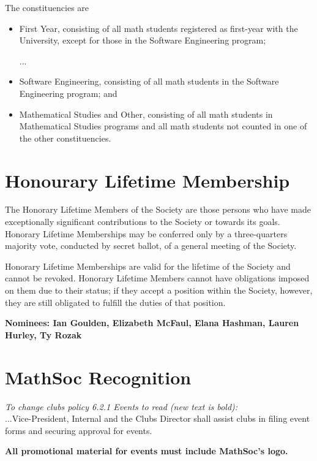 \documentclass[12pt, letterpaper]{article}
\begin{document}
The constituencies are
\begin{itemize}
	\item First Year, consisting of all math students registered as first-year
	with the University, except for those in the Software Engineering program;
	\item [...]
	\item Software Engineering, consisting of all math students in the Software
	Engineering program; and
	\item Mathematical Studies and Other, consisting of all math students in
	Mathematical Studies programs and all math students not counted in one of
	the other constituencies.
\end{itemize}

\newpage
{}


\newpage
{}
\section*{Honourary Lifetime Membership}
The Honorary Lifetime Members of the Society are those persons who have made exceptionally significant contributions to the Society or towards its goals. Honorary Lifetime Memberships may be conferred only by a three-quarters majority vote, conducted by secret ballot, of a general meeting of the Society.

Honorary Lifetime Memberships are valid for the lifetime of the Society and cannot be revoked. Honorary Lifetime Members cannot have obligations imposed on them due to their status; if they accept a position within the Society, however, they are still obligated to fulfill the duties of that position.

\textbf{Nominees: Ian Goulden, Elizabeth McFaul, Elana Hashman, Lauren Hurley, Ty Rozak}



\newpage
{}
\section*{MathSoc Recognition}
\emph{To change clubs policy 6.2.1 Events to read (new text is bold):}\\

...Vice-President, Internal and the Clubs Director shall assist clubs in filing
event forms and securing approval for events.

\textbf{All promotional material for events must include MathSoc's logo.}
\end{document}
